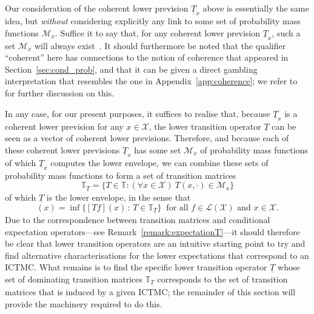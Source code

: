 \documentclass[10pt,a4paper]{paper}
\theoremstyle{definition}
\newtheorem{proposition}[theorem]{Proposition}
\newcommand{\states}{\mathcal{X}}
\newcommand{\lt}{\underline{T}}
\newcommand{\gambles}{\mathcal{L}}
\newcommand{\gamblesX}{\gambles(\states)}
\newcommand{\lrate}{\underline{Q}}
\newcommand{\norm}[1]{\left\lVert #1 \right\rVert}
\newcommand{\ictmc}{{ICTMC}}
\begin{document}
Our consideration of the coherent lower prevision $\lt_x$  above is essentially the same idea, but \emph{without} considering explicitly any link to some set of probability mass functions $\mathcal{M}_x$. Suffice it to say that, for any coherent lower prevision $\lt_x$, such a set $\mathcal{M}_x$ will always exist~\cite[Section 10.2]{Huber:1981ch}. It should furthermore be noted that the qualifier ``coherent'' here has connections to the notion of coherence that appeared in Section~\ref{sec:cond_prob}, and that it can be given a direct gambling interpretation that resembles the one in Appendix~\ref{app:coherence}; we refer to~\cite{troffaes2013:lp,Walley:1991vk} for further discussion on this.

In any case, for our present purposes, it suffices to realise that, because $\lt_x$ is a coherent lower prevision for any $x\in\states$, the lower transition operator $\lt$ can be seen as a vector of coherent lower previsions. Therefore, and because each of these coherent lower previsions $\lt_x$ has some set $\mathcal{M}_x$ of probability mass functions of which $\lt_x$ computes the lower envelope, we can combine these sets of probability mass functions to form a set of transition matrices
\begin{equation*}
\mathbb{T}_{\lt}=\{T\in\mathbb{T}\colon (\forall x\in\states)~T(x,\cdot)\in\mathcal{M}_x\}
\end{equation*}
of which $\lt$ is the lower envelope, in the sense that
\begin{equation*}
[\lt f](x) = \inf\{ [Tf](x)\,:\, T\in\mathbb{T}_{\lt} \}~
\text{ for all $f\in\gamblesX$ and $x\in\states$.}
\end{equation*}
Due to the correspondence between transition matrices and conditional expectation operators---see Remark~\ref{remark:expectationT}---it should therefore be clear that lower transition operators are an intuitive starting point to try and find alternative characterisations for the lower expectations that correspond to an \ictmc. What remains is to find the specific lower transition operator $\lt$ whose set of dominating transition matrices $\mathbb{T}_{\lt}$ corresponds to the set of transition matrices that is induced by a given \ictmc; the remainder of this section will provide the machinery required to do this.

%
\end{document}
